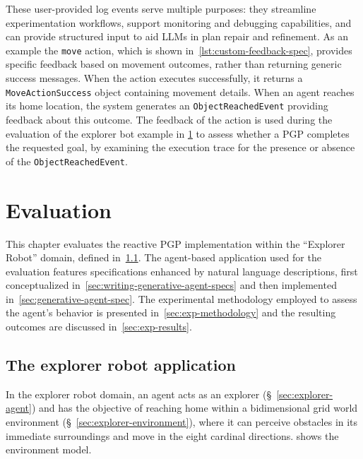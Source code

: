 \documentclass[12pt,a4paper,openright,twoside]{book}
\begin{document}
These user-provided log events serve multiple purposes: they streamline experimentation workflows, support monitoring and debugging capabilities, and can provide structured input to aid \acp{LLM} in plan repair and refinement.
%
As an example the \texttt{move} action, which is shown in~\cref{lst:custom-feedback-spec}, provides specific feedback based on movement outcomes, rather than returning generic success messages. 
%
When the action executes successfully, it returns a \texttt{MoveActionSuccess} object containing movement details. When an agent reaches its home location, the system generates an \texttt{ObjectReachedEvent} providing feedback about this outcome.
%
The feedback of the action is used during the evaluation of the explorer bot example in \cref{chap:evaluation} to assess whether a \ac{PGP} completes the requested goal, by examining the execution trace for the presence or absence of the \texttt{ObjectReachedEvent}.

\chapter{Evaluation}\label{chap:evaluation}

This chapter evaluates the reactive PGP implementation within the ``Explorer Robot'' domain, defined in~\cref{sec:exp-robot}.
%
The agent-based application used for the evaluation features specifications enhanced by natural language descriptions, first conceptualized in~\cref{sec:writing-generative-agent-specs} and then implemented in~\cref{sec:generative-agent-spec}.
%
The experimental methodology employed to assess the agent's behavior is presented in~\cref{sec:exp-methodology} and the resulting outcomes are discussed in~\cref{sec:exp-results}.

\section{The explorer robot application}\label{sec:exp-robot}

In the explorer robot domain, an agent acts as an explorer (\S~\ref{sec:explorer-agent}) and has the objective of reaching home within a bidimensional grid world environment (\S~\ref{sec:explorer-environment}), where it can perceive obstacles in its immediate surroundings and move in the eight cardinal directions.
%
 shows the environment model.
\end{document}
